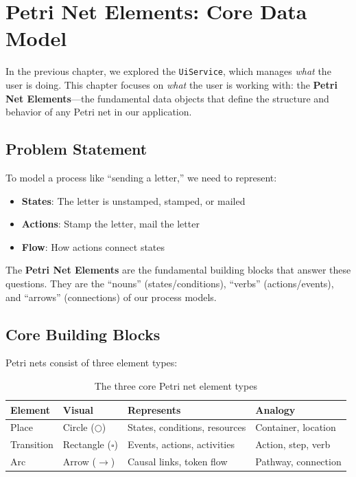 \chapter{Petri Net Elements: Core Data Model}
\label{chap:petri-net-elements}

In the previous chapter, we explored the \texttt{UiService}, which manages \textit{what} the user is doing. This chapter focuses on \textit{what} the user is working with: the \textbf{Petri Net Elements}---the fundamental data objects that define the structure and behavior of any Petri net in our application.

\section{Problem Statement}
\label{sec:elements-problem}

To model a process like ``sending a letter,'' we need to represent:
\begin{itemize}
    \item \textbf{States}: The letter is unstamped, stamped, or mailed
    \item \textbf{Actions}: Stamp the letter, mail the letter
    \item \textbf{Flow}: How actions connect states
\end{itemize}

The \textbf{Petri Net Elements} are the fundamental building blocks that answer these questions. They are the ``nouns'' (states/conditions), ``verbs'' (actions/events), and ``arrows'' (connections) of our process models.

\section{Core Building Blocks}
\label{sec:elements-overview}

Petri nets consist of three element types:

\begin{table}[htb]
    \centering
    \begin{tabular}{llll}
        \toprule
        \textbf{Element} & \textbf{Visual} & \textbf{Represents} & \textbf{Analogy} \\
        \midrule
        Place & Circle ($\bigcirc$) & States, conditions, resources & Container, location \\
        Transition & Rectangle ($\square$) & Events, actions, activities & Action, step, verb \\
        Arc & Arrow ($\rightarrow$) & Causal links, token flow & Pathway, connection \\
        \bottomrule
    \end{tabular}
    \caption{The three core Petri net element types}
    \label{tab:petri-elements}
\end{table}


